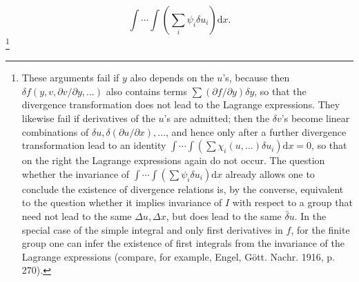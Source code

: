 \documentclass[11pt]{article}
\newcommand{\D}{\Delta}
\providecommand{\dd}{\mathrm d}
\providecommand{\bd}{\bar{\delta}}
\providecommand{\p}{\partial}
\providecommand{\p}{\partial}
\providecommand{\dd}{\mathrm d}
\begin{document}
\[
\int\!\cdots\!\int\left(\sum_i\psi_i\delta u_i\right)\dd x.
\]
\footnote{These arguments fail if \(y\) also depends on the \(u\)'s, because then \(\delta f(y,v,\p v/\p y,\ldots)\) also contains terms \(\sum(\p f/\p y)\delta y\), so that the divergence transformation does not lead to the Lagrange expressions. They likewise fail if derivatives of the \(u\)'s are admitted; then the \(\delta v\)'s become linear combinations of \(\delta u,\delta(\p u/\p x),\ldots\), and hence only after a further divergence transformation lead to an identity \(\int\!\cdots\!\int(\sum\chi_i(u,\ldots)\delta u_i)\dd x=0\), so that on the right the Lagrange expressions again do not occur. The question whether the invariance of \(\int\!\cdots\!\int(\sum\psi_i\delta u_i)\dd x\) already allows one to conclude the existence of divergence relations is, by the converse, equivalent to the question whether it implies invariance of \(I\) with respect to a group that need not lead to the same \(\D u,\D x\), but does lead to the same \(\bd u\). In the special case of the simple integral and only first derivatives in \(f\), for the finite group one can infer the existence of first integrals from the invariance of the Lagrange expressions (compare, for example, Engel, Gött. Nachr. 1916, p. 270).}
\end{document}
